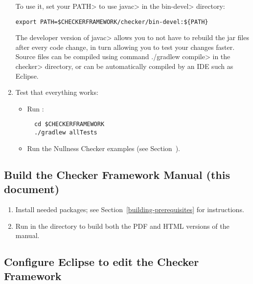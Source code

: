 \begin{enumerate}
To use it, set your \<PATH> to use \<javac> in the \<bin-devel> directory:

\begin{Verbatim}
export PATH=$CHECKERFRAMEWORK/checker/bin-devel:${PATH}
\end{Verbatim}

The developer version of \<javac> allows you to not have to rebuild
the jar files after every code change, in turn allowing you to test
your changes faster. Source files can be compiled using command \<./gradlew
compile> in the \<checker> directory, or can be automatically compiled by
an IDE such as Eclipse.

\item Test that everything works:

  \begin{itemize}

  \item Run :
\begin{Verbatim}
  cd $CHECKERFRAMEWORK
  ./gradlew allTests
\end{Verbatim}

  \item Run the Nullness Checker examples (see
    Section~).

  \end{itemize}

\end{enumerate}


\subsection{Build the Checker Framework Manual (this document)\label{building-manual}}

\begin{enumerate}
\item
Install needed packages; see Section~\ref{building-prerequisites} for
instructions.

\item
Run  in the  directory to build both the PDF and HTML versions of the manual.
\end{enumerate}


\subsection{Configure Eclipse to edit the Checker Framework\label{building-eclipse}}

